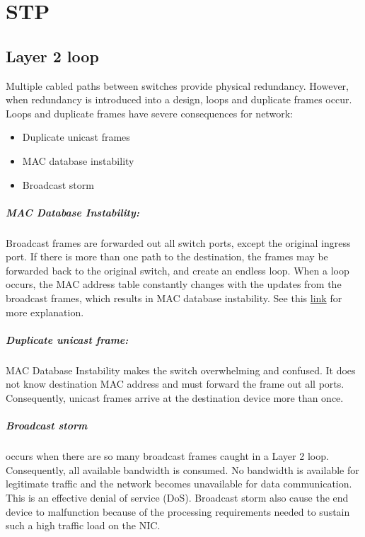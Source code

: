 \chapter{STP}\label{sec:STP}

\section{Layer 2 loop}

Multiple cabled paths between switches provide physical redundancy. However, when  redundancy is introduced into a design, loops and duplicate frames occur. Loops and duplicate frames have severe consequences for network:

\begin{itemize}
\item Duplicate unicast frames
\item MAC database instability
\item Broadcast storm
\end{itemize}

\paragraph{MAC Database Instability:}Broadcast frames are forwarded out all switch ports, except the original ingress port. If there is more than one path to the destination, the frames may be forwarded back to the original switch, and create an endless loop. When a loop occurs, the MAC address table constantly changes with the updates from the broadcast frames, which results in MAC database instability. See this \href{https://ccnav6.com/s3/course/module2/2.1.1.2/2.1.1.2.html}{link} for more explanation.

\paragraph{Duplicate unicast frame:}MAC Database Instability makes the switch overwhelming and confused. It does not know destination MAC address and must forward the frame out all ports.  Consequently, unicast frames arrive at the destination device more than once.

\paragraph{Broadcast storm}occurs when there are so many broadcast frames caught in a Layer 2 loop. Consequently, all available bandwidth is consumed. No bandwidth is available for legitimate traffic and the network becomes unavailable for data communication. This is an effective denial of service (DoS). Broadcast storm also cause the end device to malfunction because of the processing requirements needed to sustain such a high traffic load on the NIC.

